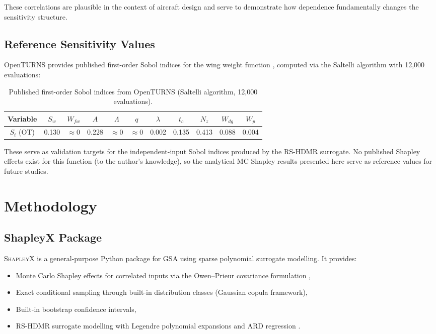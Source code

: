 \documentclass[11pt,a4paper]{article}
\begin{document}
These correlations are plausible in the context of aircraft design and serve to demonstrate how dependence fundamentally changes the sensitivity structure.

\subsection{Reference Sensitivity Values}

OpenTURNS \cite{OpenTURNS} provides published first-order Sobol indices for the wing weight function \cite{OpenTURNSWing}, computed via the Saltelli algorithm \cite{Saltelli2002} with 12,000 evaluations:

\begin{table}[H]
\centering
\caption{Published first-order Sobol indices from OpenTURNS (Saltelli algorithm, 12,000 evaluations).}
\label{tab:ref_sobol}
\begin{tabular}{ccccccccccc}
\toprule
Variable & $S_w$ & $W_{fw}$ & $A$ & $\Lambda$ & $q$ & $\lambda$ & $t_c$ & $N_z$ & $W_{dg}$ & $W_p$ \\
\midrule
$S_i$ (OT) & 0.130 & $\approx 0$ & 0.228 & $\approx 0$ & $\approx 0$ & 0.002 & 0.135 & 0.413 & 0.088 & 0.004 \\
\bottomrule
\end{tabular}
\end{table}

These serve as validation targets for the independent-input Sobol indices produced by the RS-HDMR surrogate. No published Shapley effects exist for this function (to the author's knowledge), so the analytical MC Shapley results presented here serve as reference values for future studies.

\section{Methodology}

\subsection{ShapleyX Package}

\textsc{ShapleyX} \cite{ShapleyX2026} is a general-purpose Python package for GSA using sparse polynomial surrogate modelling. It provides:
\begin{itemize}[nosep]
    \item Monte Carlo Shapley effects for correlated inputs via the Owen--Prieur covariance formulation \cite{OwenPrieur2017},
    \item Exact conditional sampling through built-in distribution classes (Gaussian copula framework),
    \item Built-in bootstrap confidence intervals,
    \item RS-HDMR surrogate modelling with Legendre polynomial expansions and ARD regression \cite{Tipping2001}.
\end{itemize}
\end{document}
